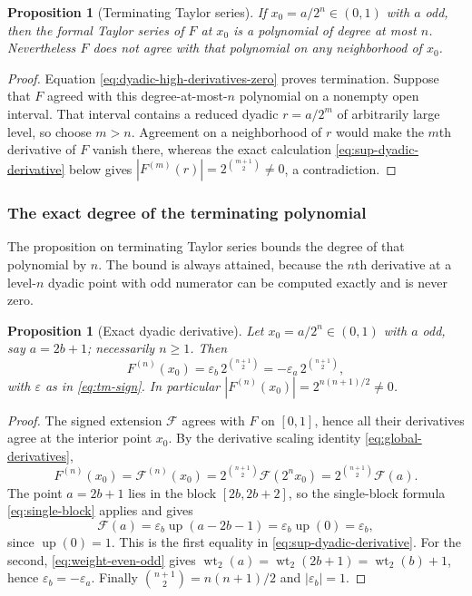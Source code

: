 \documentclass[11pt,oneside]{article}
\newtheorem{proposition}[theorem]{Proposition}
\theoremstyle{definition}
\theoremstyle{remark}
\newcommand{\Up}{\operatorname{up}}
\newcommand{\wt}{\operatorname{wt}_2}
\begin{document}
\begin{proposition}[Terminating Taylor series]
If $x_0=a/2^n\in(0,1)$ with $a$ odd, then the formal Taylor series of $F$ at $x_0$ is a
polynomial of degree at most $n$.  Nevertheless $F$ does not agree with that polynomial on
any neighborhood of $x_0$.
\end{proposition}

\begin{proof}
Equation \eqref{eq:dyadic-high-derivatives-zero} proves termination.  Suppose that $F$ agreed
with this degree-at-most-$n$ polynomial on a nonempty open interval.  That interval contains
a reduced dyadic $r=a/2^m$ of arbitrarily large level, so choose $m>n$.  Agreement on a
neighborhood of $r$ would make the $m$th derivative of $F$ vanish there, whereas the exact
calculation \eqref{eq:sup-dyadic-derivative} below gives
$|F^{(m)}(r)|=2^{\binom{m+1}{2}}\ne0$, a contradiction.
\end{proof}

\subsubsection{The exact degree of the terminating polynomial}

The proposition on terminating Taylor series bounds the degree of that polynomial by $n$.
The bound is always attained, because the $n$th derivative at a level-$n$ dyadic point with
odd numerator can be computed exactly and is never zero.

\begin{proposition}[Exact dyadic derivative]\label{thm:sup-dyadic-derivative}
Let $x_0=a/2^{n}\in(0,1)$ with $a$ odd, say $a=2b+1$; necessarily $n\ge1$.  Then
\begin{equation}
 F^{(n)}(x_0)=\varepsilon_b\,2^{\binom{n+1}{2}}
 =-\varepsilon_a\,2^{\binom{n+1}{2}},                       \label{eq:sup-dyadic-derivative}
\end{equation}
with $\varepsilon$ as in \eqref{eq:tm-sign}.  In particular
$|F^{(n)}(x_0)|=2^{n(n+1)/2}\ne0$.
\end{proposition}

\begin{proof}
The signed extension $\mathcal F$ agrees with $F$ on $[0,1]$, hence all their derivatives
agree at the interior point $x_0$.  By the derivative scaling identity
\eqref{eq:global-derivatives},
\begin{equation*}
 F^{(n)}(x_0)=\mathcal F^{(n)}(x_0)
 =2^{\binom{n+1}{2}}\mathcal F(2^{n}x_0)
 =2^{\binom{n+1}{2}}\mathcal F(a).
\end{equation*}
The point $a=2b+1$ lies in the block $[2b,2b+2]$, so the single-block formula
\eqref{eq:single-block} applies and gives
\begin{equation*}
 \mathcal F(a)=\varepsilon_b\Up(a-2b-1)=\varepsilon_b\Up(0)=\varepsilon_b,
\end{equation*}
since $\Up(0)=1$.  This is the first equality in \eqref{eq:sup-dyadic-derivative}.  For the
second, \eqref{eq:weight-even-odd} gives $\wt(a)=\wt(2b+1)=\wt(b)+1$, hence
$\varepsilon_b=-\varepsilon_a$.  Finally $\binom{n+1}{2}=n(n+1)/2$ and
$|\varepsilon_b|=1$.
\end{proof}
\end{document}

